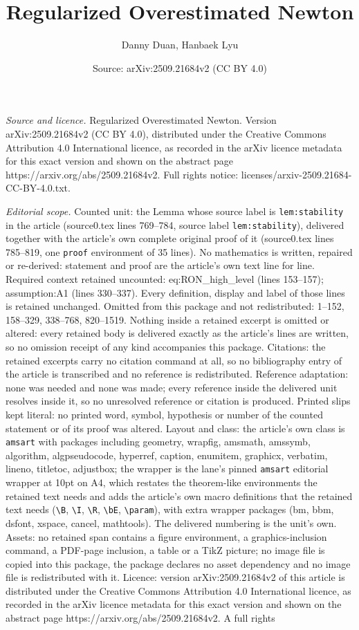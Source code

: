 \documentclass[10pt,a4paper]{amsart}
\title[Regularized Overestimated Newton]{Regularized Overestimated Newton}
\author{Danny Duan, Hanbaek Lyu}
\date{Source: arXiv:2509.21684v2 (CC BY 4.0)}
\begin{document}
\maketitle

\noindent\emph{Source and licence.} Regularized Overestimated Newton. Version arXiv:2509.21684v2 (CC BY 4.0), distributed under the Creative Commons Attribution 4.0 International licence, as recorded in the arXiv licence metadata for this exact version and shown on the abstract page https://arxiv.org/abs/2509.21684v2. Full rights notice: licenses/arxiv-2509.21684-CC-BY-4.0.txt.\par\smallskip

\noindent\textit{Editorial scope.} Counted unit: the Lemma whose source label is \texttt{lem:stability} in the article (source0.tex lines 769--784, source label \texttt{lem:stability}), delivered together with the article's own complete original proof of it (source0.tex lines 785--819, one \texttt{proof} environment of 35 lines). No mathematics is written, repaired or re-derived: statement and proof are the article's own text line for line. Required context retained uncounted: eq:RON\_high\_level (lines 153--157); assumption:A1 (lines 330--337). Every definition, display and label of those lines is retained unchanged. Omitted from this package and not redistributed: 1--152, 158--329, 338--768, 820--1519. Nothing inside a retained excerpt is omitted or altered: every retained body is delivered exactly as the article's lines are written, so no omission receipt of any kind accompanies this package. Citations: the retained excerpts carry no citation command at all, so no bibliography entry of the article is transcribed and no reference is redistributed. Reference adaptation: none was needed and none was made; every reference inside the delivered unit resolves inside it, so no unresolved reference or citation is produced. Printed slips kept literal: no printed word, symbol, hypothesis or number of the counted statement or of its proof was altered. Layout and class: the article's own class is \texttt{amsart} with packages including geometry, wrapfig, amsmath, amssymb, algorithm, algpseudocode, hyperref, caption, enumitem, graphicx, verbatim, lineno, titletoc, adjustbox; the wrapper is the lane's pinned \texttt{amsart} editorial wrapper at 10pt on A4, which restates the theorem-like environments the retained text needs and adds the article's own macro definitions that the retained text needs (\texttt{\textbackslash B}, \texttt{\textbackslash I}, \texttt{\textbackslash R}, \texttt{\textbackslash bE}, \texttt{\textbackslash param}), with extra wrapper packages (bm, bbm, dsfont, xspace, cancel, mathtools). The delivered numbering is the unit's own. Assets: no retained span contains a figure environment, a graphics-inclusion command, a PDF-page inclusion, a table or a TikZ picture; no image file is copied into this package, the package declares no asset dependency and no image file is redistributed with it. Licence: version arXiv:2509.21684v2 of this article is distributed under the Creative Commons Attribution 4.0 International licence, as recorded in the arXiv licence metadata for this exact version and shown on the abstract page https://arxiv.org/abs/2509.21684v2. A full rights 
\end{document}
